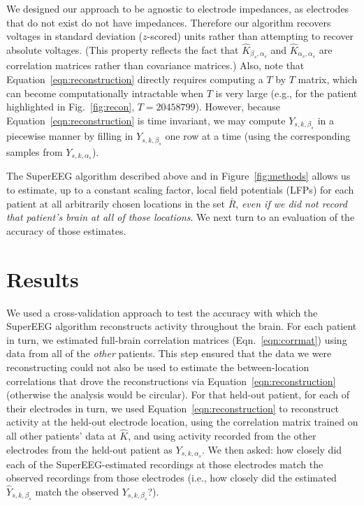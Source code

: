 \documentclass[11pt]{article}
\begin{document}
We designed our approach to be agnostic to electrode impedances, as
electrodes that do not exist do not have impedances.  Therefore our
algorithm recovers voltages in standard deviation ($z$-scored) units
rather than attempting to recover absolute voltages. (This property
reflects the fact that $\hat{K}_{\beta_s, \alpha_s}$ and
$\hat{K}_{\alpha_s, \alpha_s}$ are correlation matrices rather than
covariance matrices.)  Also, note that
Equation~\ref{eqn:reconstruction} directly requires computing a $T$ by $T$
matrix, which can become computationally intractable when $T$ is very
large (e.g., for the patient highlighted in Fig.~\ref{fig:recon}, $T =
20458799$). However, because Equation~\ref{eqn:reconstruction} is time
invariant, we may compute $Y_{s,k,\beta_s}$ in a piecewise
manner by filling in $Y_{s,k,\beta_s}$ one row at a time (using the
corresponding samples from $Y_{s, k, \alpha_s}$).

The SuperEEG algorithm described above and in Figure~\ref{fig:methods}
allows us to estimate, up to a constant scaling factor, local field
potentials (LFPs) for each patient at all arbitrarily chosen locations
in the set $\bar{R}$, \textit{even if we did not record that patient's
  brain at all of those locations}.  We next turn to an evaluation of
the accuracy of those estimates.

\section*{Results}
We used a cross-validation approach to test the accuracy with which
the SuperEEG algorithm reconstructs activity throughout the brain.
For each patient in turn, we estimated full-brain correlation matrices
(Eqn.~\ref{eqn:corrmat}) using data from all of the \textit{other}
patients. This step ensured that the data we were reconstructing could
not also be used to estimate the between-location correlations that
drove the reconstructions via Equation~\ref{eqn:reconstruction}
(otherwise the analysis would be circular).  For that held-out
patient, for each of their electrodes in turn, we used
Equation~\ref{eqn:reconstruction} to reconstruct activity at the
held-out electrode location, using the correlation matrix trained on
all other patients' data at $\hat{K}$, and using activity recorded
from the other electrodes from the held-out patient as
$Y_{s, k, \alpha_s}$.  We then asked: how closely did each of the
SuperEEG-estimated recordings at those electrodes match the observed
recordings from those electrodes (i.e., how closely did the estimated
$\hat{Y}_{s, k, \beta_s}$ match the observed $Y_{s, k, \beta_s}$?).
\end{document}
